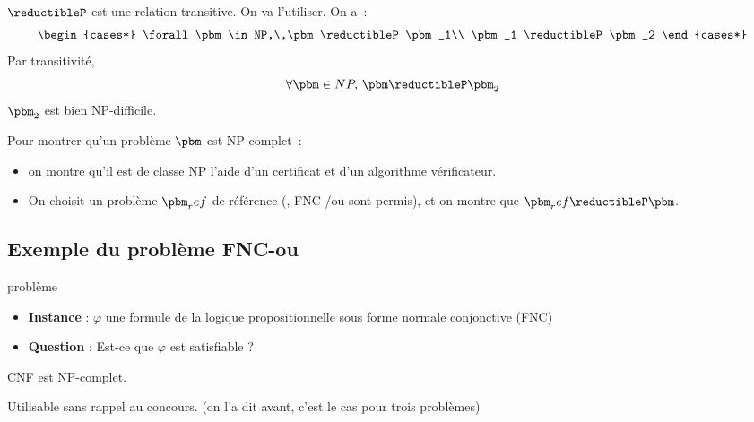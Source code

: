\begin{demonstration}
    $\reductibleP$ est une relation transitive. On va l'utiliser. On a~:
    $$ \begin{cases*}
        \forall \pbm \in NP,\,\pbm \reductibleP \pbm_1\\
        \pbm_1 \reductibleP \pbm_2
    \end{cases*} $$
    Par transitivité,
    $$\forall \pbm \in NP,\,\pbm \reductibleP \pbm_2$$
    $\pbm_2$ est bien NP-difficile.
\end{demonstration}

\begin{remarque}{}{}
    Pour montrer qu'un problème $\pbm$ est NP-complet~:
    \begin{itemize}
        \item on montre qu'il est de classe NP  l'aide d'un certificat et d'un algorithme vérificateur.
        \item On choisit un problème $\pbm_ref$ de référence (\sat, FNC-\sat/\cnfsat ou \troissat sont permis), et on montre que $\pbm_ref \reductibleP \pbm$.
    \end{itemize}
\end{remarque}

\subsection{Exemple du problème FNC-\sat ou \cnfsat}

\begin{definition}{}{problème \cnfsat}
    \begin{itemize}
        \item \textbf{Instance} : $\varphi$ une formule de la logique propositionnelle sous forme normale conjonctive (FNC)
        \item \textbf{Question} : Est-ce que $\varphi$ est satisfiable ?
    \end{itemize}
\end{definition}

\begin{proposition}{}{}
    CNF est NP-complet.
\end{proposition}

\begin{remarque}{}{}
    Utilisable sans rappel au concours. (on l'a dit avant, c'est le cas pour trois problèmes)
\end{remarque}

